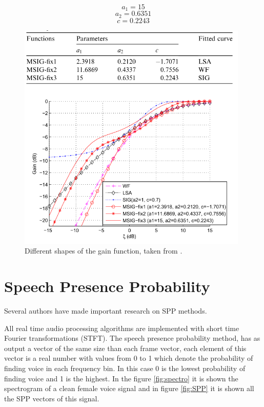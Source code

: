 $$a_1=15$$
$$a_2     = 0.6351$$
$$c       = 0.2243$$
\begin{figure}[!ht]
  \centering
	\includegraphics[width=110mm]{Kap2/sigm}
	\caption{Different shapes of the gain function, taken from \cite{Yong2013OptimizationEnhancement}.}
	\label{fig:sigm}
\end{figure}



\section{Speech Presence Probability}

Several authors have made important research on SPP methods. 

All real time audio processing algorithms are implemented with short time Fourier transformations (STFT). The speech presence probability method, has as output a vector of the same size than each frame vector, each element of this vector is a real number with values from 0 to 1 which denote the probability of finding voice in each frequency bin. In this case 0 is the lowest probability of finding voice and 1 is the highest. In the figure \ref{fig:spectro} it is shown the spectrogram of a clean female voice signal and in figure \ref{fig:SPP} it is shown all the SPP vectors of this signal. 

